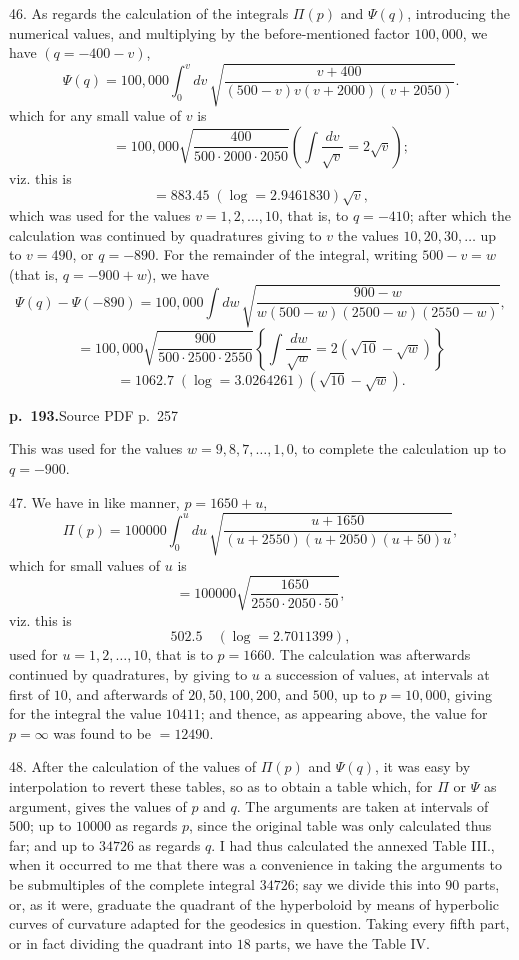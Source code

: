 \documentclass[11pt,a4paper]{article}
\newcommand{\sourcepage}[2]{\par\bigskip\noindent\textbf{p.~#1.}\hfill{\footnotesize Source PDF p.~#2}\par\nobreak\medskip}
\begin{document}
46. As regards the calculation of the integrals $\Pi(p)$ and $\Psi(q)$, introducing the numerical values, and multiplying by the before-mentioned factor $100,000$, we have $(q=-400-v)$,
\[
\Psi(q)=100,000\int_0^v dv\,
\sqrt{\frac{v+400}{(500-v)v(v+2000)(v+2050)}}.
\]
which for any small value of $v$ is
\[
=100,000\sqrt{\frac{400}{500\cdot 2000\cdot 2050}}
\left(\int\frac{dv}{\sqrt v}=2\sqrt v\right);
\]
viz. this is
\[
=883.45\;(\log=2.9461830)\sqrt v,
\]
which was used for the values $v=1,2,\ldots,10$, that is, to $q=-410$; after which the calculation was continued by quadratures giving to $v$ the values $10,20,30,\ldots$ up to $v=490$, or $q=-890$. For the remainder of the integral, writing $500-v=w$ (that is, $q=-900+w$), we have
\[
\Psi(q)-\Psi(-890)
=100,000\int dw\,
\sqrt{\frac{900-w}{w(500-w)(2500-w)(2550-w)}},
\]
\[
=100,000\sqrt{\frac{900}{500\cdot2500\cdot2550}}
\left\{\int\frac{dw}{\sqrt w}=2(\sqrt{10}-\sqrt w)\right\}
\]
\[
=1062.7\;(\log=3.0264261)(\sqrt{10}-\sqrt w).
\]

\sourcepage{193}{257}
This was used for the values $w=9,8,7,\ldots,1,0$, to complete the calculation up to $q=-900$.

47. We have in like manner, $p=1650+u$,
\[
\Pi(p)=100000\int_0^u du\,
\sqrt{\frac{u+1650}{(u+2550)(u+2050)(u+50)u}},
\]
which for small values of $u$ is
\[
=100000\sqrt{\frac{1650}{2550\cdot2050\cdot50}},
\]
viz. this is
\[
502.5\quad(\log=2.7011399),
\]
used for $u=1,2,\ldots,10$, that is to $p=1660$. The calculation was afterwards continued by quadratures, by giving to $u$ a succession of values, at intervals at first of $10$, and afterwards of $20,50,100,200$, and $500$, up to $p=10,000$, giving for the integral the value $10411$; and thence, as appearing above, the value for $p=\infty$ was found to be $=12490$.

48. After the calculation of the values of $\Pi(p)$ and $\Psi(q)$, it was easy by interpolation to revert these tables, so as to obtain a table which, for $\Pi$ or $\Psi$ as argument, gives the values of $p$ and $q$. The arguments are taken at intervals of $500$; up to $10000$ as regards $p$, since the original table was only calculated thus far; and up to $34726$ as regards $q$. I had thus calculated the annexed Table III., when it occurred to me that there was a convenience in taking the arguments to be submultiples of the complete integral $34726$; say we divide this into $90$ parts, or, as it were, graduate the quadrant of the hyperboloid by means of hyperbolic curves of curvature adapted for the geodesics in question. Taking every fifth part, or in fact dividing the quadrant into $18$ parts, we have the Table IV.
\end{document}
